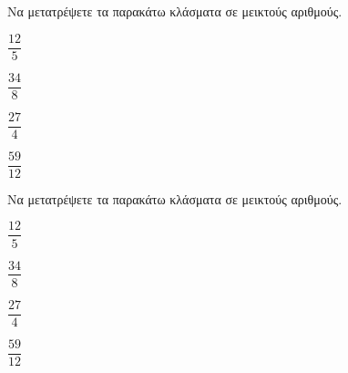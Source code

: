 Να μετατρέψετε τα παρακάτω κλάσματα σε μεικτούς αριθμούς.
\begin{multicols}{4}
\begin{rlist}
\item $ \dfrac{12}{5} $
\item $ \dfrac{34}{8} $
\item $ \dfrac{27}{4} $
\item $ \dfrac{59}{12} $
\end{rlist}
\end{multicols}
Να μετατρέψετε τα παρακάτω κλάσματα σε μεικτούς αριθμούς.
\begin{multicols}{4}
\begin{rlist}
\item $ \dfrac{12}{5} $
\item $ \dfrac{34}{8} $
\item $ \dfrac{27}{4} $
\item $ \dfrac{59}{12} $
\end{rlist}
\end{multicols}
